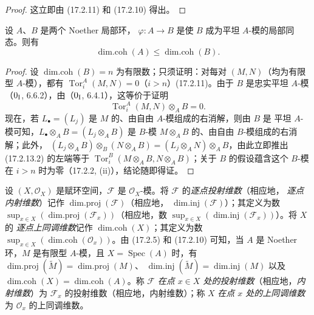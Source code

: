 \begin{proof}
这立即由 (17.2.11) 和 (17.2.10) 得出。
\end{proof}

\begin{proposition}[17.2.13]
\label{0.17.2.13-fr}
设 $A$、$B$ 是两个 Noether 局部环，
$\varphi:A\longrightarrow B$ 是使 $B$ 成为平坦 $A$-模的局部同态。则有
\begin{equation}
\label{0.17.2.13.1-fr}
\tag{17.2.13.1}
  \operatorname{dim.coh}(A)\leq\operatorname{dim.coh}(B).
\end{equation}
\end{proposition}

\begin{proof}
设 $\operatorname{dim.coh}(B)=n$ 为有限数；只须证明：对每对
$(M,N)$（均为有限型 $A$-模），都有
$\operatorname{Tor}^A_i(M,N)=0$（$i>n$）(17.2.11)。由于
$B$ 是忠实平坦 $A$-模（$0_{\rm I}$, 6.6.2），由（$0_{\rm I}$, 6.4.1），这等价于证明
\begin{equation}
\label{0.17.2.13.2-fr}
\tag{17.2.13.2}
  \operatorname{Tor}^A_i(M,N)\otimes_A B=0.
\end{equation}
现在，若 $L_\bullet=(L_j)$ 是 $M$ 的、由自由 $A$-模组成的右消解，则由 $B$ 是
平坦 $A$-模可知，$L_\bullet\otimes_A B=(L_j\otimes_A B)$ 是
$B$-模 $M\otimes_A B$ 的、由自由 $B$-模组成的右消解；此外，
$(L_j\otimes_A B)\otimes_B(N\otimes_A B)
=(L_j\otimes_A N)\otimes_A B$，由此立即推出 (17.2.13.2) 的左端等于
$\operatorname{Tor}^B_i(M\otimes_A B,N\otimes_A B)$；关于 $B$ 的假设蕴含这个
$B$-模在 $i>n$ 时为零（17.2.2, (ii)），结论随即得证。
\end{proof}

\begin{env}[17.2.14]
\label{0.17.2.14-fr}
设 $(X,\mathscr{O}_X)$ 是赋环空间，$\mathscr{F}$ 是
$\mathscr{O}_X$-模。将 $\mathscr{F}$ 的\emph{逐点投射维数}（相应地，
\emph{逐点内射维数}）记作
$\operatorname{dim.proj}(\mathscr{F})$（相应地，
$\operatorname{dim.inj}(\mathscr{F})$）；其定义为数
$\sup_{x\in X}(\operatorname{dim.proj}(\mathscr{F}_x))$（相应地，数
$\sup_{x\in X}(\operatorname{dim.inj}(\mathscr{F}_x))$）。将 $X$ 的
\emph{逐点上同调维数}记作 $\operatorname{dim.coh}(X)$；其定义为数
$\sup_{x\in X}(\operatorname{dim.coh}(\mathscr{O}_x))$。由 (17.2.5) 和
(17.2.10) 可知，当 $A$ 是 Noether 环，$M$ 是有限型 $A$-模，且
$X=\operatorname{Spec}(A)$ 时，有
$\operatorname{dim.proj}(\widetilde{M})=\operatorname{dim.proj}(M)$、
$\operatorname{dim.inj}(\widetilde{M})=\operatorname{dim.inj}(M)$ 以及
$\operatorname{dim.coh}(X)=\operatorname{dim.coh}(A)$。称 $\mathscr{F}$
\emph{在点 $x\in X$ 处的投射维数}（相应地，\emph{内射维数}）为
$\mathscr{F}_x$ 的投射维数（相应地，内射维数）；称 $X$
\emph{在点 $x$ 处的上同调维数}为 $\mathscr{O}_x$ 的上同调维数。
\end{env}

